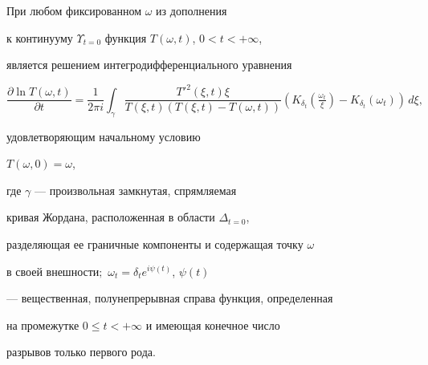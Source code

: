 




\begin{thm}


При любом фиксированном $\omega$ из дополнения


к континууму $\Upsilon_{t=0}$ функция $T(\omega,t)$, $0<t<+\infty$, 


является решением интегродифференциального уравнения


$$


\frac{\partial\ln T(\omega,t)}{\partial t}=


\frac{1}{2\pi i}


\int_{\gamma}


\frac{{T'}^{2}(\xi,t)\xi}{T(\xi,t)(T(\xi,t)-T(\omega,t))}


(K_{\delta_{t}}(\tfrac{\omega_{t}}{\xi})-K_{\delta_{t}}(\omega_{t}))\,d\xi,


$$


удовлетворяющим начальному условию 


$T(\omega,0)=\omega$,


где $\gamma$ --- произвольная замкнутая, спрямляемая


кривая Жордана, расположенная в области $\Delta_{t=0}$,


разделяющая ее граничные компоненты и содержащая точку $\omega$ 


в своей внешности$;$ $\omega_{t}=\delta_{t}e^{i\psi(t)}$, $\psi(t)$ 


--- вещественная, полунепрерывная справа функция, определенная 


на промежутке $0\le t<+\infty$ и имеющая конечное число 


разрывов только первого рода. 


\end{thm}





